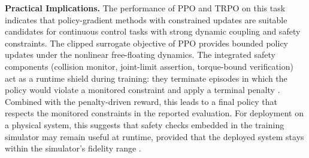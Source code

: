 \documentclass{ieeeaccess}
\begin{document}
\textbf{Practical Implications.} The performance of PPO and TRPO on this task indicates that policy-gradient methods with constrained updates are suitable candidates for continuous control tasks with strong dynamic coupling and safety constraints. The clipped surrogate objective of PPO provides bounded policy updates under the nonlinear free-floating dynamics. The integrated safety components (collision monitor, joint-limit assertion, torque-bound verification) act as a runtime shield during training: they terminate episodes in which the policy would violate a monitored constraint and apply a terminal penalty \cite{b15,b23,b22}. Combined with the penalty-driven reward, this leads to a final policy that respects the monitored constraints in the reported evaluation. For deployment on a physical system, this suggests that safety checks embedded in the training simulator may remain useful at runtime, provided that the deployed system stays within the simulator's fidelity range \cite{b22,b24}.
\end{document}
